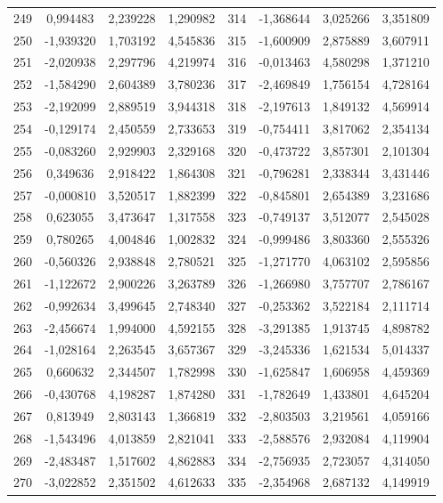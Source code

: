 \begin{apendicesenv}
\begin{table}[H]
\begin{tabular}{c c c c c c c c}
		249 & 0,994483 & 2,239228 & 1,290982 & 314 & -1,368644 & 3,025266 & 3,351809 \\
		250 & -1,939320 & 1,703192 & 4,545836 & 315 & -1,600909 & 2,875889 & 3,607911 \\
		251 & -2,020938 & 2,297796 & 4,219974 & 316 & -0,013463 & 4,580298 & 1,371210 \\
		252 & -1,584290 & 2,604389 & 3,780236 & 317 & -2,469849 & 1,756154 & 4,728164 \\
		253 & -2,192099 & 2,889519 & 3,944318 & 318 & -2,197613 & 1,849132 & 4,569914 \\
		254 & -0,129174 & 2,450559 & 2,733653 & 319 & -0,754411 & 3,817062 & 2,354134 \\
		255 & -0,083260 & 2,929903 & 2,329168 & 320 & -0,473722 & 3,857301 & 2,101304 \\
		256 & 0,349636 & 2,918422 & 1,864308 & 321 & -0,796281 & 2,338344 & 3,431446 \\
		257 & -0,000810 & 3,520517 & 1,882399 & 322 & -0,845801 & 2,654389 & 3,231686 \\
		258 & 0,623055 & 3,473647 & 1,317558 & 323 & -0,749137 & 3,512077 & 2,545028 \\
		259 & 0,780265 & 4,004846 & 1,002832 & 324 & -0,999486 & 3,803360 & 2,555326 \\
		260 & -0,560326 & 2,938848 & 2,780521 & 325 & -1,271770 & 4,063102 & 2,595856 \\
		261 & -1,122672 & 2,900226 & 3,263789 & 326 & -1,266980 & 3,757707 & 2,786167 \\
		262 & -0,992634 & 3,499645 & 2,748340 & 327 & -0,253362 & 3,522184 & 2,111714 \\
		263 & -2,456674 & 1,994000 & 4,592155 & 328 & -3,291385 & 1,913745 & 4,898782 \\
		264 & -1,028164 & 2,263545 & 3,657367 & 329 & -3,245336 & 1,621534 & 5,014337 \\
		265 & 0,660632 & 2,344507 & 1,782998 & 330 & -1,625847 & 1,606958 & 4,459369 \\
		266 & -0,430768 & 4,198287 & 1,874280 & 331 & -1,782649 & 1,433801 & 4,645204 \\
		267 & 0,813949 & 2,803143 & 1,366819 & 332 & -2,803503 & 3,219561 & 4,059166 \\
		268 & -1,543496 & 4,013859 & 2,821041 & 333 & -2,588576 & 2,932084 & 4,119904 \\
		269 & -2,483487 & 1,517602 & 4,862883 & 334 & -2,756935 & 2,723057 & 4,314050 \\
		270 & -3,022852 & 2,351502 & 4,612633 & 335 & -2,354968 & 2,687132 & 4,149919 \\

\end{tabular}
\end{table}
\end{apendicesenv}

